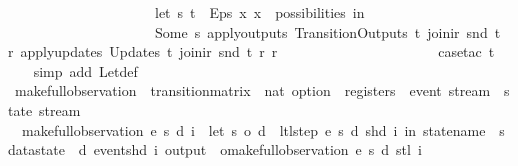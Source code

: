 \begin{isabellebody}
\ \ \ \ \ \ \ \ \ \ \ \ \ \ \ \ \ \ \ \ \ let\ {\isacharparenleft}s{\isacharprime}{\isacharcomma}\ t{\isacharprime}{\isacharparenright}\ {\isacharequal}\ Eps\ {\isacharparenleft}{\isasymlambda}x{\isachardot}\ x\ {\isacharbar}{\isasymin}{\isacharbar}\ possibilities{\isacharparenright}\ in\isanewline
\ \ \ \ \ \ \ \ \ \ \ \ \ \ \ \ \ \ \ \ \ {\isacharparenleft}Some\ s{\isacharprime}{\isacharcomma}\ {\isacharparenleft}apply{\isacharunderscore}outputs\ {\isacharparenleft}Transition{\isachardot}Outputs\ t{\isacharprime}{\isacharparenright}\ {\isacharparenleft}join{\isacharunderscore}ir\ {\isacharparenleft}snd\ t{\isacharparenright}\ r{\isacharparenright}{\isacharparenright}{\isacharcomma}\ {\isacharparenleft}apply{\isacharunderscore}updates\ {\isacharparenleft}Updates\ t{\isacharprime}{\isacharparenright}\ {\isacharparenleft}join{\isacharunderscore}ir\ {\isacharparenleft}snd\ t{\isacharparenright}\ r{\isacharparenright}\ r{\isacharparenright}{\isacharparenright}\isanewline
\ \ \ \ \ \ \ \ \ \ \ \ \ \ \ \ \ \ {\isacharparenright}{\isachardoublequoteclose}\isanewline
%
\isadelimproof
\ \ %
\endisadelimproof
%
\isatagproof
{}\isamarkupfalse%
\ {\isacharparenleft}case{\isacharunderscore}tac\ t{\isacharparenright}\isanewline
\ \ \isamarkupfalse%
\ {\isacharparenleft}simp\ add{\isacharcolon}\ Let{\isacharunderscore}def{\isacharparenright}%
\endisatagproof
{\isafoldproof}%
%
\isadelimproof
\isanewline
%
\endisadelimproof
\isanewline
{}\isamarkupfalse%
\ make{\isacharunderscore}full{\isacharunderscore}observation\ {\isacharcolon}{\isacharcolon}\ {\isachardoublequoteopen}transition{\isacharunderscore}matrix\ {\isasymRightarrow}\ nat\ option\ {\isasymRightarrow}\ registers\ {\isasymRightarrow}\ event\ stream\ {\isasymRightarrow}\ state\ stream{\isachardoublequoteclose}\ \isanewline
\ \ {\isachardoublequoteopen}make{\isacharunderscore}full{\isacharunderscore}observation\ e\ s\ d\ i\ {\isacharequal}\ {\isacharparenleft}let\ {\isacharparenleft}s{\isacharprime}{\isacharcomma}\ o{\isacharprime}{\isacharcomma}\ d{\isacharprime}{\isacharparenright}\ {\isacharequal}\ ltl{\isacharunderscore}step\ e\ s\ d\ {\isacharparenleft}shd\ i{\isacharparenright}\ in\ {\isasymlparr}statename\ {\isacharequal}\ s{\isacharcomma}\ datastate\ {\isacharequal}\ d{\isacharcomma}\ event{\isacharequal}{\isacharparenleft}shd\ i{\isacharparenright}{\isacharcomma}\ output\ {\isacharequal}\ o{\isacharprime}{\isasymrparr}{\isacharhash}{\isacharhash}{\isacharparenleft}make{\isacharunderscore}full{\isacharunderscore}observation\ e\ s{\isacharprime}\ d{\isacharprime}\ {\isacharparenleft}stl\ i{\isacharparenright}{\isacharparenright}{\isacharparenright}{\isachardoublequoteclose}\isanewline

\end{isabellebody}

